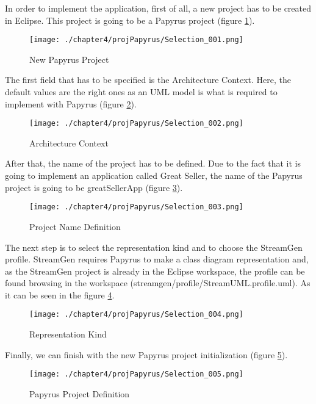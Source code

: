 In order to implement the application, first of all, a new project has to be created in Eclipse. This project is going to be a Papyrus project (figure \ref{fig:Papyrus Project}).

\begin{figure}
\centering
{\texttt{[image: ./chapter4/projPapyrus/Selection\_001.png]}}
\caption{New Papyrus Project}
\label{fig:Papyrus Project}
\end{figure}

The first field that has to be specified is the Architecture Context. Here, the default values are the right ones as an UML model is what is required to implement with Papyrus (figure \ref{fig:Architecture Context}).

\begin{figure}
\centering
{\texttt{[image: ./chapter4/projPapyrus/Selection\_002.png]}}
\caption{Architecture Context}
\label{fig:Architecture Context}
\end{figure}

After that, the name of the project has to be defined. Due to the fact that it is going to implement an application called Great Seller, the name of the Papyrus project is going to be greatSellerApp (figure \ref{fig:Project Name Definition}).

\begin{figure}
\centering
{\texttt{[image: ./chapter4/projPapyrus/Selection\_003.png]}}
\caption{Project Name Definition}
\label{fig:Project Name Definition}
\end{figure}

The next step is to select the representation kind and to choose the StreamGen profile. StreamGen requires Papyrus to make a class diagram representation and, as the StreamGen project is already in the Eclipse workspace, the profile can be found browsing in the workspace (streamgen/profile/StreamUML.profile.uml). As it can be seen in the figure \ref{fig:Representation Kind}.

\begin{figure}
\centering
{\texttt{[image: ./chapter4/projPapyrus/Selection\_004.png]}}
\caption{Representation Kind}
\label{fig:Representation Kind}
\end{figure}

Finally, we can finish with the new Papyrus project initialization (figure \ref{fig:Papyrus Project Definition}).

\begin{figure}
\centering
{\texttt{[image: ./chapter4/projPapyrus/Selection\_005.png]}}
\caption{Papyrus Project Definition}
\label{fig:Papyrus Project Definition}
\end{figure}

